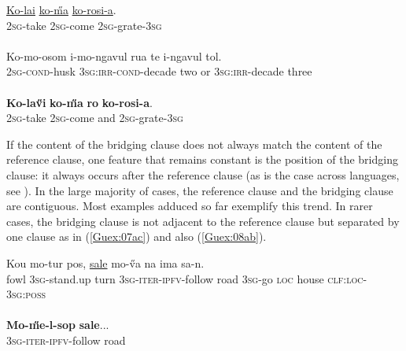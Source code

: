\documentclass[output=paper]{LSP/langsci}
\begin{document}
\begin{exe}
\ex \label{Guex:07ac}
\begin{xlist}
\ex \label{Guex:07a}
\gll \underline{Ko-lai}   \underline{ko-\H{m}a}    \underline{ko-rosi-a}.\\
\textsc{2sg}-take   \textsc{2sg}-come   \textsc{2sg}-grate-\textsc{3sg}\\
\glt {}\\
\ex \label{Guex:07b}
\gll Ko-mo-osom  i-mo-ngavul               rua   te     i-ngavul    tol.\\
\textsc{2sg}-\textsc{cond}-husk  \textsc{3sg:irr-cond}-decade   two   or     \textsc{3sg:irr}-decade  three \\
\glt {}\\
\ex \label{Guex:07c}
\gll \textbf{Ko-la\H{v}i}  \textbf{ko-\H{m}a}  \textbf{ro}    \textbf{ko-rosi-a}.\\     	   
\textsc{2sg}-take   \textsc{2sg}-come  and \textsc{2sg}-grate-\textsc{3sg}\\
\glt {} 
\end{xlist}
\end{exe}



If the content of the bridging clause does not always match the content of the reference clause, one feature that remains constant is the position of the bridging clause: it always occurs after the reference clause (as is the case across languages, see ). In the large majority of cases, the reference clause and the bridging clause are contiguous. Most examples adduced so far exemplify this trend. In rarer cases, the bridging clause is not adjacent to the reference clause but separated by one clause as in (\ref{Guex:07ac}) and also (\ref{Guex:08ab}).

\begin{exe}
\ex \label{Guex:08ab}
\begin{xlist}
\ex \label{Guex:08a}
\gll Kou    mo-tur           pos,      \underline{}                          \underline{sale} mo-\H{v}a       na  ima          sa-n.\\
fowl   \textsc{3sg}-stand.up    turn    \textsc{3sg}-\textsc{iter}-\textsc{ipfv}-follow   road       \textsc{3sg}-go  \textsc{loc}  house  \textsc{clf:loc-3sg:poss}\\
\glt {}\\
\ex \label{Guex:08b}
\gll \textbf{Mo-\H{m}e-l-sop}  \textbf{sale}...\\     	       
\textsc{3sg}-\textsc{iter}-\textsc{ipfv}-follow   road\\
\glt {} 
\end{xlist}
\end{exe}
\end{document}

